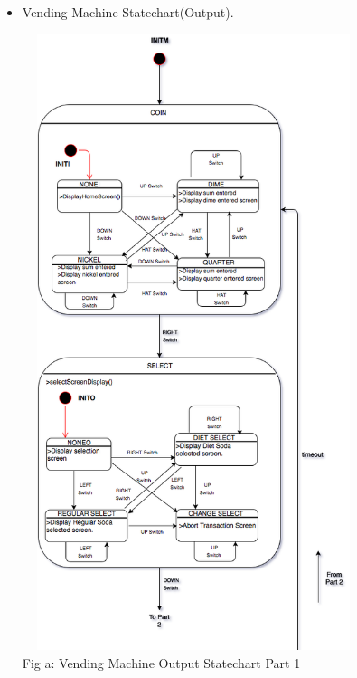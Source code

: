 \documentclass{article}
\begin{document}
\begin{itemize}
\begin{lstlisting}[basicstyle = \small, language = C]
        // Output Control State Machine.
        switch(vm_mode){
        case INITM:
            // Resets various variables.
            sum = 0;
            reg_n = 0;
            diet_n = 0;
            vm_mode = COIN;
            input = INITI;
            output = INITO;
        case COIN:
            coinScreenDisplay();
            break;
        case SELECT:
            selectScreenDisplay();
            break;
        case DELIVERY:
            deliveryOutput();
            break;
        }
    }
}
  \end{lstlisting}
 \item Vending Machine Statechart(Output).
\begin{center}
\includegraphics[width=10cm, height=18cm]{vendingMachineOutput1}
\\ {\small Fig a: Vending Machine Output Statechart Part 1}

\end{center}
\end{itemize}
\end{document}
